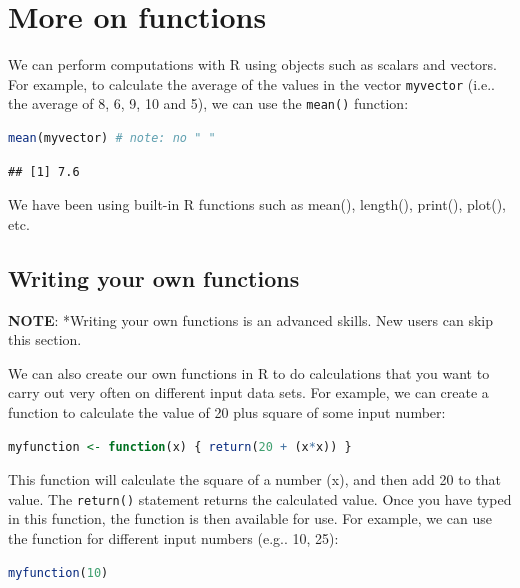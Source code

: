\documentclass[
]{book}
\newcommand{\passthrough}[1]{#1}
\begin{document}
\hypertarget{more-on-functions}{%
\section{More on functions}\label{more-on-functions}}

We can perform computations with R using objects such as scalars and vectors. For example, to calculate the average of the values in the vector \passthrough{\lstinline!myvector!} (i.e.. the average of 8, 6, 9, 10 and 5), we can use the \passthrough{\lstinline!mean()!} function:

\begin{lstlisting}[language=R]
mean(myvector) # note: no " "
\end{lstlisting}

\begin{lstlisting}
## [1] 7.6
\end{lstlisting}

We have been using built-in R functions such as mean(), length(), print(), plot(), etc.

\hypertarget{writing-your-own-functions}{%
\subsection{Writing your own functions}\label{writing-your-own-functions}}

\textbf{NOTE}: *Writing your own functions is an advanced skills. New users can skip this section.

We can also create our own functions in R to do calculations that you want to carry out very often on different input data sets. For example, we can create a function to calculate the value of 20 plus square of some input number:

\begin{lstlisting}[language=R]
myfunction <- function(x) { return(20 + (x*x)) }
\end{lstlisting}

This function will calculate the square of a number (x), and then add 20 to that value. The \passthrough{\lstinline!return()!} statement returns the calculated value. Once you have typed in this function, the function is then available for use. For example, we can use the function for different input numbers (e.g.. 10, 25):

\begin{lstlisting}[language=R]
myfunction(10)
\end{lstlisting}
\end{document}
